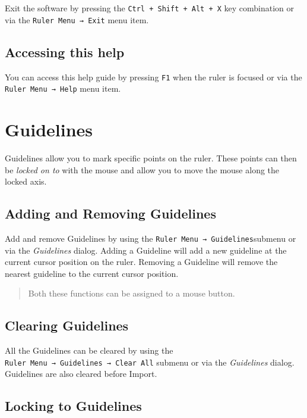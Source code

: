 \documentclass[
]{book}
\begin{document}
Exit the software by pressing the \texttt{Ctrl\ +\ Shift\ +\ Alt\ +\ X} key combination or via the \texttt{Ruler\ Menu\ →\ Exit} menu item.

\section{Accessing this help}\label{help}

You can access this help guide by pressing \texttt{F1} when the ruler is focused or via the \texttt{Ruler\ Menu\ →\ Help} menu item.

\chapter{Guidelines}\label{guidelines}

Guidelines allow you to mark specific points on the ruler.
These points can then be \emph{locked on to} with the mouse and allow you to move the mouse along the locked axis.

\section{Adding and Removing Guidelines}\label{adding-and-removing-guidelines}

Add and remove Guidelines by using the \texttt{Ruler\ Menu\ →\ Guidelines}submenu or via the \emph{Guidelines} dialog.
Adding a Guideline will add a new guideline at the current cursor position on the ruler.
Removing a Guideline will remove the nearest guideline to the current cursor position.

\begin{quote}
Both these functions can be assigned to a mouse button.
\end{quote}

\section{Clearing Guidelines}\label{clearing-guidelines}

All the Guidelines can be cleared by using the \texttt{Ruler\ Menu\ →\ Guidelines\ →\ Clear\ All} submenu or via the \emph{Guidelines} dialog.
Guidelines are also cleared before Import.

\section{Locking to Guidelines}\label{locking-to-guidelines}
\end{document}
